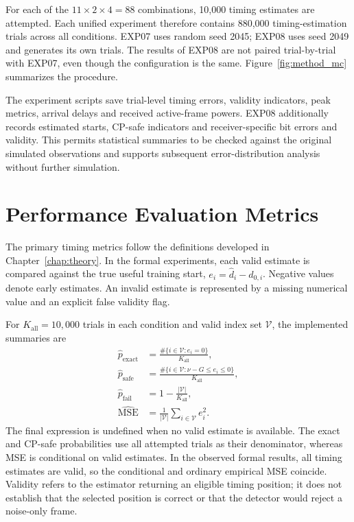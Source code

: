 For each of the $11\times2\times4=88$ combinations, 10,000 timing estimates are attempted. Each unified experiment therefore contains 880,000 timing-estimation trials across all conditions. EXP07 uses random seed 2045; EXP08 uses seed 2049 and generates its own trials. The results of EXP08 are not paired trial-by-trial with EXP07, even though the configuration is the same. Figure~\ref{fig:method_mc} summarizes the procedure.

The experiment scripts save trial-level timing errors, validity indicators, peak metrics, arrival delays and received active-frame powers. EXP08 additionally records estimated starts, CP-safe indicators and receiver-specific bit errors and validity. This permits statistical summaries to be checked against the original simulated observations and supports subsequent error-distribution analysis without further simulation.

\section{Performance Evaluation Metrics}
The primary timing metrics follow the definitions developed in Chapter~\ref{chap:theory}. In the formal experiments, each valid estimate is compared against the true useful training start, $e_i=\hat d_i-d_{0,i}$. Negative values denote early estimates. An invalid estimate is represented by a missing numerical value and an explicit false validity flag.

For $K_{\mathrm{all}}=10,000$ trials in each condition and valid index set $\mathcal{V}$, the implemented summaries are
\begin{align}
 \widehat{p}_{\mathrm{exact}}&=\frac{\#\{i\in\mathcal{V}:e_i=0\}}{K_{\mathrm{all}}},\\
 \widehat{p}_{\mathrm{safe}}&=\frac{\#\{i\in\mathcal{V}:\nu-G\leq e_i\leq0\}}{K_{\mathrm{all}}},\\
 \widehat{p}_{\mathrm{fail}}&=1-\frac{|\mathcal{V}|}{K_{\mathrm{all}}},\\
 \widehat{\mathrm{MSE}}&=\frac{1}{|\mathcal{V}|}\sum_{i\in\mathcal{V}}e_i^2.
\end{align}
The final expression is undefined when no valid estimate is available. The exact and CP-safe probabilities use all attempted trials as their denominator, whereas MSE is conditional on valid estimates. In the observed formal results, all timing estimates are valid, so the conditional and ordinary empirical MSE coincide. Validity refers to the estimator returning an eligible timing position; it does not establish that the selected position is correct or that the detector would reject a noise-only frame.

